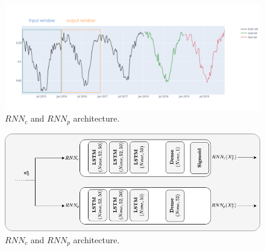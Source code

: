 \documentclass{article} %
\newcommand{\predictor}{RNN_p}
\newcommand{\classifier}{RNN_c}
\begin{document}
\begin{figure}
  \centering
    \includegraphics[width=1.\linewidth]{figure/train_eval_test_set}
  \caption{$\classifier$ and $\predictor$ architecture.}
\label{fig:train_eval_test_set}
\end{figure}

\begin{figure}
  \centering
    \includegraphics[width=0.8\linewidth]{figure/rnn_archi}
  \caption{$\classifier$ and $\predictor$ architecture.}
\label{fig:rnn_architecture}
\end{figure}


\end{document}
